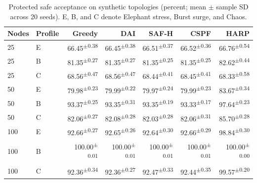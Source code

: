 \documentclass[final,5p]{elsarticle}
\begin{document}
\begin{table}[t]
\centering
\caption{Protected safe acceptance on synthetic topologies (percent; mean $\pm$ sample SD across 20 seeds). E, B, and C denote Elephant stress, Burst surge, and Chaos.}
\label{tab:synthetic_stress}
\scriptsize
\begin{tabular}{llrrrrr}
\toprule
Nodes & Profile & Greedy & DAI & SAF-H & CSPF & HARP \\
\midrule
25 & E & 66.45\textsuperscript{$\pm$0.38} & 66.45\textsuperscript{$\pm$0.38} & 66.51\textsuperscript{$\pm$0.37} & 66.52\textsuperscript{$\pm$0.36} & 66.76\textsuperscript{$\pm$0.54} \\
25 & B & 81.35\textsuperscript{$\pm$0.27} & 81.35\textsuperscript{$\pm$0.27} & 81.35\textsuperscript{$\pm$0.25} & 81.35\textsuperscript{$\pm$0.25} & 82.62\textsuperscript{$\pm$0.44} \\
25 & C & 68.56\textsuperscript{$\pm$0.47} & 68.56\textsuperscript{$\pm$0.47} & 68.44\textsuperscript{$\pm$0.41} & 68.45\textsuperscript{$\pm$0.41} & 68.33\textsuperscript{$\pm$0.58} \\
50 & E & 79.98\textsuperscript{$\pm$0.23} & 79.99\textsuperscript{$\pm$0.22} & 79.97\textsuperscript{$\pm$0.24} & 79.99\textsuperscript{$\pm$0.23} & 83.67\textsuperscript{$\pm$0.34} \\
50 & B & 93.37\textsuperscript{$\pm$0.25} & 93.35\textsuperscript{$\pm$0.31} & 93.35\textsuperscript{$\pm$0.19} & 93.33\textsuperscript{$\pm$0.17} & 97.64\textsuperscript{$\pm$0.23} \\
50 & C & 82.06\textsuperscript{$\pm$0.27} & 82.08\textsuperscript{$\pm$0.28} & 82.03\textsuperscript{$\pm$0.28} & 82.06\textsuperscript{$\pm$0.31} & 85.70\textsuperscript{$\pm$0.28} \\
100 & E & 92.66\textsuperscript{$\pm$0.27} & 92.65\textsuperscript{$\pm$0.26} & 92.64\textsuperscript{$\pm$0.30} & 92.66\textsuperscript{$\pm$0.29} & 98.84\textsuperscript{$\pm$0.30} \\
100 & B & 100.00\textsuperscript{$\pm$0.01} & 100.00\textsuperscript{$\pm$0.01} & 100.00\textsuperscript{$\pm$0.01} & 100.00\textsuperscript{$\pm$0.01} & 100.00\textsuperscript{$\pm$0.00} \\
100 & C & 92.36\textsuperscript{$\pm$0.34} & 92.36\textsuperscript{$\pm$0.27} & 92.47\textsuperscript{$\pm$0.33} & 92.44\textsuperscript{$\pm$0.35} & 99.57\textsuperscript{$\pm$0.20} \\

\bottomrule
\end{tabular}
\end{table}
\end{document}
